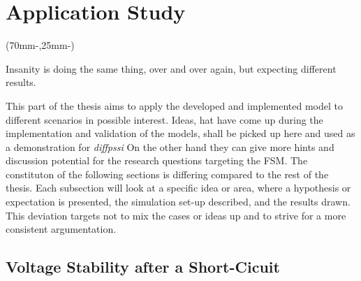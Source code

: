 


\chapter{Application Study}
\label{chap:case-study}

\begin{textblock*}{.7\textwidth}(70mm-\offset,25mm-\offset)
    \begin{fquote}
        Insanity is doing the same thing, over and over again, but expecting different results.
    \end{fquote}
\end{textblock*}

This part of the thesis aims to apply the developed and implemented model to different scenarios in possible interest.
Ideas, hat have come up during the implementation and validation of the models, shall be picked up here and used as a demonstration for \textit{diffpssi}
On the other hand they can give more hints and discussion potential for the research questions targeting the \acs{FSM}.
The constituton of the following sections is differing compared to the rest of the thesis.
Each subsection will look at a specific idea or area, where a hypothesis or expectation is presented, the simulation set-up described, and the results drawn.
This deviation targets not to mix the cases or ideas up and to strive for a more consistent argumentation.

\section{Voltage Stability after a Short-Cicuit}
\label{sec:case-1}

